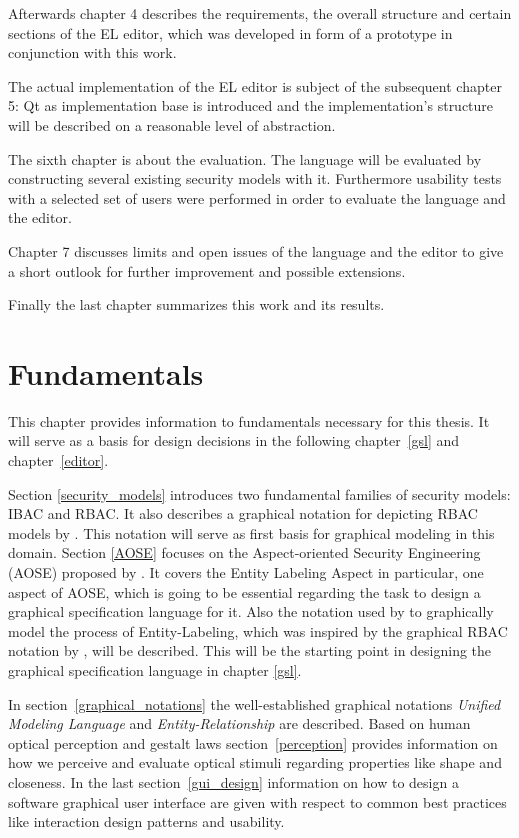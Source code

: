 \documentclass[twoside, openright, 12pt]{book}
\begin{document}
Afterwards chapter 4 describes the requirements, the overall structure and certain sections of the EL editor, which was developed in form of a prototype in conjunction with this work.

The actual implementation of the EL editor is subject of the subsequent chapter 5:
Qt as implementation base is introduced and the implementation's structure will be described on a reasonable level of abstraction.

The sixth chapter is about the evaluation.
The language will be evaluated by constructing several existing security models with it.
Furthermore usability tests with a selected set of users were performed in order to evaluate the language and the editor.

Chapter 7 discusses limits and open issues of the language and the editor to give a short outlook for further improvement and possible extensions.

Finally the last chapter summarizes this work and its results.





\cleardoublepage
\chapter{Fundamentals}
\label{fundamentals}
This chapter provides information to fundamentals necessary for this thesis.
It will serve as a basis for design decisions in the following chapter~\ref{gsl} and chapter~\ref{editor}.

Section \ref{security_models} introduces two fundamental families of security models: IBAC and RBAC.
It also describes a graphical notation for depicting RBAC models by \cite{Sandhu96}.
This notation will serve as first basis for graphical modeling in this domain.
Section \ref{AOSE} focuses on the Aspect-oriented Security Engineering (AOSE) proposed by \citet*{Amthor18}.
It covers the Entity Labeling Aspect in particular, one aspect of AOSE, which is going to be essential regarding the task to design a graphical specification language for it.
Also the notation used by \citet*{Amthor18} to graphically model the process of Entity-Labeling, which was inspired by the graphical RBAC notation by \cite{Sandhu96}, will be described.
This will be the starting point in designing the graphical specification language in chapter \ref{gsl}.

In section~\ref{graphical_notations} the well-established graphical notations \textit{Unified Modeling Language} and \textit{Entity-Relationship} are described.
Based on human optical perception and gestalt laws section~\ref{perception} provides information on how we perceive and evaluate optical stimuli regarding properties like shape and closeness.
In the last section~\ref{gui_design} information on how to design a software graphical user interface are given with respect to common best practices like interaction design patterns and usability.
\end{document}
